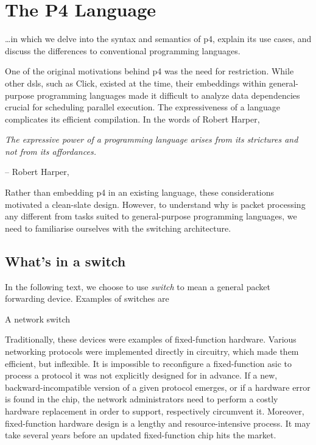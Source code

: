 
\chapter{The P4 Language}

\begin{chapterabstract}
	\dots in which we delve into the syntax and semantics of \acrshort{p4},
	explain its use cases, and discuss the differences to conventional programming
	languages.
\end{chapterabstract}

One of the original motivations behind \acrshort{p4} was the need for
restriction. While other \acrlong{dsl}s, such as Click, existed
at the time, their embeddings within general-purpose programming languages made
it difficult to analyze data dependencies crucial for scheduling parallel
execution. The expressiveness of a language complicates its efficient
compilation. In the words of Robert Harper,

\begin{displayquote}
	\textit{The expressive power of a programming language arises from its
	strictures and \emph{not} from its affordances.}

	-- Robert Harper,  \cite{pfpl1oplss2019}
\end{displayquote}

Rather than embedding \acrshort{p4} in an existing language, these
considerations motivated a clean-slate design. However, to understand why is
packet processing any different from tasks suited to general-purpose programming
languages, we need to familiarise ourselves with the switching architecture.

\section{What's in a switch}

In the following text, we choose to use \emph{switch} to mean a general packet
forwarding device. Examples of switches are

A network switch

Traditionally, these devices were examples of fixed-function hardware. Various
networking protocols were implemented directly in circuitry, which made them
efficient, but inflexible. It is impossible to reconfigure a fixed-function
\acrshort{asic} to process a protocol it was not explicitly designed for in
advance. If a new, backward-incompatible version of a given protocol emerges, or
if a hardware error is found in the chip, the network administrators need to
perform a costly hardware replacement in order to support, respectively
circumvent it. Moreover, fixed-function hardware design is a lengthy and
resource-intensive process. It may take several years before an updated
fixed-function chip hits the market.

